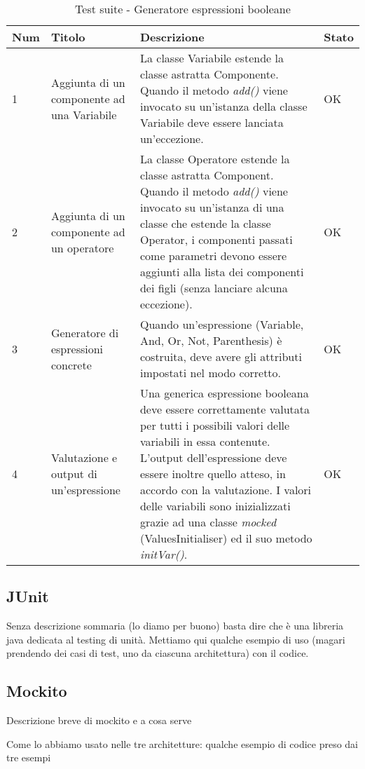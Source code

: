 \begin{table}[h!]
\caption{Test suite - Generatore espressioni booleane}
\centering %
\begin{tabular}{|p{1cm}|p{3cm}|p{7cm}|p{1cm}|} %
\hline\hline %
\textbf{Num} & \textbf{Titolo} & \textbf{Descrizione} & \textbf{Stato} \\ [0.5ex] %
\hline %
1 & Aggiunta di un componente ad una Variabile & La classe Variabile estende la classe astratta Componente. Quando il metodo \emph{add()} viene invocato su un'istanza della classe Variabile deve essere lanciata un'eccezione. & OK \\ \hline%
2 & Aggiunta di un componente ad un operatore & La classe Operatore estende la classe astratta Component. Quando il metodo \emph{add()} viene invocato su un'istanza di una classe che estende la classe Operator, i componenti passati come parametri devono essere aggiunti alla lista dei componenti dei figli (senza lanciare alcuna eccezione). & OK \\ \hline
3 & Generatore di espressioni concrete & Quando un'espressione (Variable, And, Or, Not, Parenthesis) è costruita, deve avere gli attributi impostati nel modo corretto. & OK \\ \hline
4 & Valutazione e output di un'espressione & Una generica espressione booleana deve essere correttamente valutata per tutti i possibili valori delle variabili in essa contenute. L'output dell'espressione deve essere inoltre quello atteso, in accordo con la valutazione. I valori delle variabili sono inizializzati grazie ad una classe \emph{mocked} (ValuesInitialiser) ed il suo metodo \emph{initVar()}. & OK \\ [1ex] %
\hline %
\end{tabular}
\label{table:observerstrategy} 
\end{table}


\subsection{JUnit}

Senza descrizione sommaria (lo diamo per buono) basta dire che è una libreria java dedicata al testing di unità. Mettiamo qui qualche esempio di uso (magari prendendo dei casi di test, uno da ciascuna architettura) con il codice.

\subsection{Mockito}

Descrizione breve di mockito e a cosa serve

Come lo abbiamo usato nelle tre architetture: qualche esempio di codice preso dai tre esempi